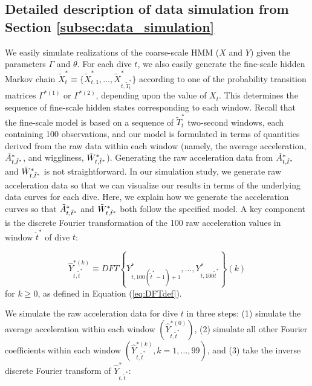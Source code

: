 \subsection{Detailed description of data simulation from Section \ref{subsec:data_simulation}}


\setcounter{equation}{4}   %


We easily simulate realizations of the coarse-scale HMM ($X$ and $Y$) given the parameters $\Gamma$ and $\theta$. For each dive $t$, we also easily generate the fine-scale hidden Markov chain $\tilde X^*_t \equiv \big\{\tilde X^*_{t,1},\ldots,\tilde X^*_{t,\tilde T_t^*}\big\}$ according to one of the probability transition matrices $\Gamma^{*(1)}$ or $\Gamma^{*(2)}$, depending upon the value of $X_t$. This determines the sequence of fine-scale hidden states corresponding to each window. Recall that the fine-scale model is based on a sequence of $\tilde T_t^*$ two-second windows, each containing 100 observations, and our model is formulated in terms of quantities derived from the raw data within each window (namely, the average acceleration, $\tilde{A}^*_{t,\tilde t^*}$, and wiggliness, $\tilde{W}^*_{ t,\tilde t^*}$). Generating the raw acceleration data from $\tilde{A}^*_{t,\tilde t^*}$ and $\tilde{W}^*_{ t,\tilde t^*}$ is not straightforward. In our simulation study, we generate raw acceleration data so that we can visualize our results in terms of the underlying data curves for each dive. Here, we explain how we generate the acceleration curves so that $\tilde{A}^*_{t,\tilde t^*}$ and $\tilde{W}^*_{ t,\tilde t^*}$ both follow the specified model. A key component is the discrete Fourier transformation of the 100 raw acceleration values in window $\tilde{t}^*$ of dive $t$:

\[
    \hat{Y}^{*(k)}_{t,\tilde{t}^*}  \equiv DFT\left\{Y^*_{t,100 (\tilde{t}^*-1) + 1 },\ldots, Y^*_{t,100 \tilde{t}^*}\right\}(k)
\]
for $k \geq 0$, as defined in Equation (\ref{eq:DFTdef}).

We simulate the raw acceleration data for dive $t$ in three steps: (1) simulate the average acceleration within each window $\left(\hat Y^{*(0)}_{t,\tilde t^*}\right)$, (2) simulate all other Fourier coefficients within each window $\left(\hat Y^{*(k)}_{t,\tilde t^*}, k = 1,\ldots,99\right)$, and (3) take the inverse discrete Fourier transform of $\hat{Y}^*_{t,\tilde t^*}$:

